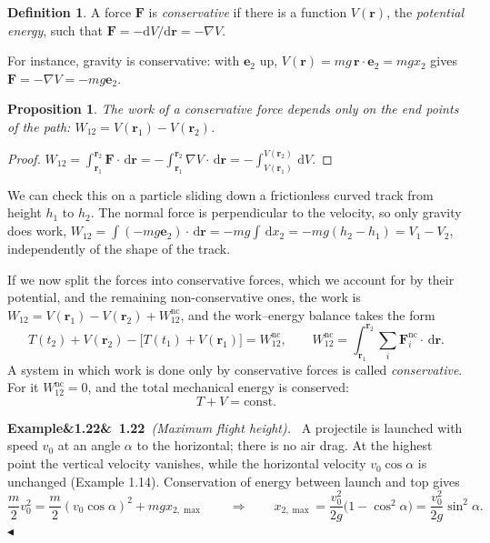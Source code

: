 \documentclass[11pt,a4paper,oneside]{report}
\numberwithin{equation}{chapter}
\newcommand{\vect}[1]{\bm{#1}}
\newcommand{\e}[1]{\vect{e}_{#1}}
\newcommand{\dd}{\,\mathrm{d}}
\theoremstyle{plain}
\newtheorem{proposition}[theorem]{Proposition}
\theoremstyle{definition}
\newtheorem{definition}[theorem]{Definition}
\theoremstyle{remark}
\newenvironment{example}[2]{%
  \par\addvspace{\bigskipamount}\noindent
  \textbf{Example\ifx&#1&\else~#1\fi}\ \textit{(#2).}\ \ignorespaces}%
  {\hfill$\blacktriangleleft$\par\addvspace{\bigskipamount}}
\begin{document}
\begin{definition}
A force $\vect F$ is \emph{conservative} if there is a function $V(\vect r)$, the \emph{potential energy}, such that
$\vect F=-\mathrm dV/\mathrm d\vect r=-\nabla V$.
\end{definition}

For instance, gravity is conservative: with $\e2$ up, $V(\vect r)=mg\,\vect r\cdot\e2=mgx_2$ gives
$\vect F=-\nabla V=-mg\e2$.

\begin{proposition}
The work of a conservative force depends only on the end points of the path: $W_{12}=V(\vect r_1)-V(\vect r_2)$.
\end{proposition}
\begin{proof}
$W_{12}=\int_{\vect r_1}^{\vect r_2}\vect F\cdot\dd\vect r=-\int_{\vect r_1}^{\vect r_2}\nabla V\cdot\dd\vect r=-\int_{V(\vect r_1)}^{V(\vect r_2)}\dd V$.
\end{proof}

We can check this on a particle sliding down a frictionless curved track from height $h_1$ to $h_2$. The normal
force is perpendicular to the velocity, so only gravity does work,
$W_{12}=\int(-mg\e2)\cdot\dd\vect r=-mg\int\dd x_2=-mg(h_2-h_1)=V_1-V_2$, independently of the shape of the track.

If we now split the forces into conservative forces, which we account for by their potential, and the remaining
non-conservative ones, the work is $W_{12}=V(\vect r_1)-V(\vect r_2)+W_{12}^{\text{nc}}$, and the work--energy
balance takes the form
\begin{equation}\label{eq:web-pot}
  T(t_2)+V(\vect r_2)-\big[T(t_1)+V(\vect r_1)\big]=W_{12}^{\text{nc}},\qquad
  W_{12}^{\text{nc}}=\int_{\vect r_1}^{\vect r_2}\sum_i\vect F_i^{\text{nc}}\cdot\dd\vect r .
\end{equation}
A system in which work is done only by conservative forces is called \emph{conservative}. For it $W^{\text{nc}}_{12}=0$,
and the total mechanical energy is conserved:
\begin{equation}
  T+V=\text{const}.
\end{equation}

\begin{example}{1.22}{Maximum flight height}
A projectile is launched with speed $v_0$ at an angle $\alpha$ to the horizontal; there is no air drag. At the
highest point the vertical velocity vanishes, while the horizontal velocity $v_0\cos\alpha$ is unchanged
(Example 1.14). Conservation of energy between launch and top gives
\[
  \frac m2v_0^2=\frac m2(v_0\cos\alpha)^2+mgx_{2,\max}\qquad\Longrightarrow\qquad
  x_{2,\max}=\frac{v_0^2}{2g}\big(1-\cos^2\alpha\big)=\frac{v_0^2}{2g}\sin^2\alpha .
\]
\end{example}
\end{document}
